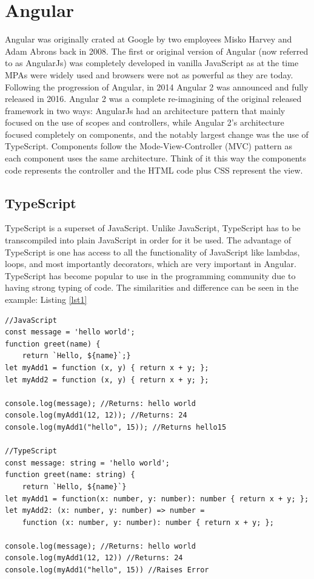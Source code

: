 \documentclass[11pt]{article}
\begin{document}
\section{Angular} 
Angular was originally crated at Google by two employees Misko Harvey and Adam Abrons back in 2008. The first or original version
of Angular (now referred to as AngularJs) was completely developed in vanilla JavaScript as at the time MPAs were widely used and
browsers were not as powerful as they are today. Following the progression of Angular, in 2014 Angular 2 was announced and fully
released in 2016. Angular 2 was a complete re-imagining of the original released framework in two ways: AngularJs had an architecture
pattern that mainly focused on the use of scopes and controllers, while Angular 2's architecture focused completely on components, and 
the notably largest change was the use of TypeScript. Components follow the Mode-View-Controller (MVC) pattern as each component uses the 
same architecture. Think of it this way the components code represents the controller and the HTML code plus CSS represent the view.

\subsection{TypeScript}
    TypeScript is a superset of JavaScript. Unlike JavaScript, TypeScript has to be transcompiled into
plain JavaScript in order for it be used. The advantage of TypeScript is one has access to all the functionality of JavaScript like lambdas, 
loops, and most importantly decorators, which are very important in Angular. TypeScript has become popular to use in the programming community
due to having strong typing of code. The similarities and difference can be seen in the example: Listing \ref{lst1}

\begin{lstlisting}[caption={JavaScript vs TypeScript},label={lst1}]
//JavaScript
const message = 'hello world';
function greet(name) {
    return `Hello, ${name}`;}
let myAdd1 = function (x, y) { return x + y; };
let myAdd2 = function (x, y) { return x + y; };

console.log(message); //Returns: hello world
console.log(myAdd1(12, 12)); //Returns: 24
console.log(myAdd1("hello", 15)); //Returns hello15

//TypeScript
const message: string = 'hello world';
function greet(name: string) {
    return `Hello, ${name}`}
let myAdd1 = function(x: number, y: number): number { return x + y; };
let myAdd2: (x: number, y: number) => number =
    function (x: number, y: number): number { return x + y; };
  
console.log(message); //Returns: hello world
console.log(myAdd1(12, 12)) //Returns: 24    
console.log(myAdd1("hello", 15)) //Raises Error
\end{lstlisting}
\end{document}
